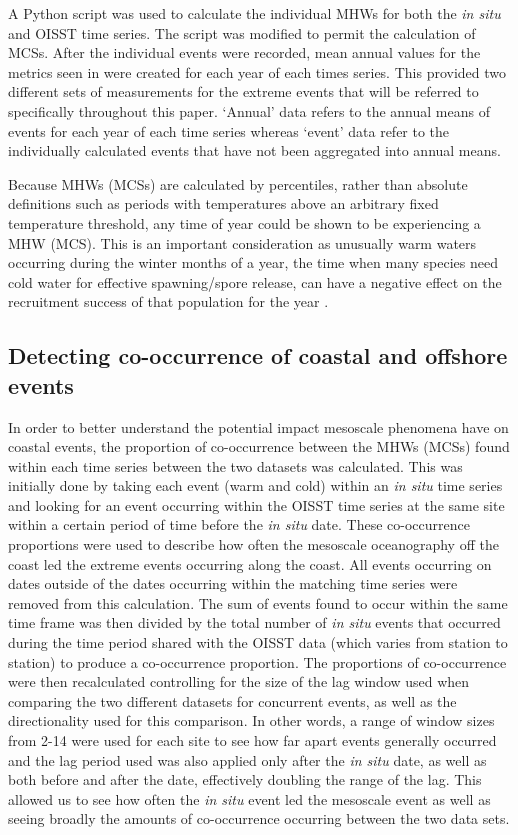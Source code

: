 \documentclass[a4paper,10pt,review]{elsarticle}
\begin{document}
A Python script \citep[https://github.com/ecjoliver/marineHeatWaves; see][]{Hobday2016} was used to calculate the individual MHWs for both the \emph{in situ} and OISST time series. The script was modified to permit the calculation of MCSs. After the individual events were recorded, mean annual values for the metrics seen in  were created for each year of each times series. This provided two different sets of measurements for the extreme events that will be referred to specifically throughout this paper. `Annual' data refers to the annual means of events for each year of each time series whereas `event' data refer to the individually calculated events that have not been aggregated into annual means.

Because MHWs (MCSs) are calculated by percentiles, rather than absolute definitions such as periods with temperatures above an arbitrary fixed temperature threshold, any time of year could be shown to be experiencing a MHW (MCS). This is an important consideration as unusually warm waters occurring during the winter months of a year, the time when many species need cold water for effective spawning/spore release, can have a negative effect on the recruitment success of that population for the year \citep{Wernberg2011}.

\subsection{Detecting co-occurrence of coastal and offshore events}
In order to better understand the potential impact mesoscale phenomena have on coastal events, the proportion of co-occurrence between the MHWs (MCSs) found within each time series between the two datasets was calculated. This was initially done by taking each event (warm and cold) within an \emph{in situ} time series and looking for an event occurring within the OISST time series at the same site within a certain period of time before the \emph{in situ} date. These co-occurrence proportions were used to describe how often the mesoscale oceanography off the coast led the extreme events occurring along the coast. All events occurring on dates outside of the dates occurring within the matching time series were removed from this calculation. The sum of events found to occur within the same time frame was then divided by the total number of \emph{in situ} events that occurred during the time period shared with the OISST data (which varies from station to station) to produce a co-occurrence proportion. The proportions of co-occurrence were then recalculated controlling for the size of the lag window used when comparing the two different datasets for concurrent events, as well as the directionality used for this comparison. In other words, a range of window sizes from 2-14 were used for each site to see how far apart events generally occurred and the lag period used was also applied only after the \emph{in situ} date, as well as both before and after the date, effectively doubling the range of the lag. This allowed us to see how often the \emph{in situ} event led the mesoscale event as well as seeing broadly the amounts of co-occurrence occurring between the two data sets.
\end{document}
